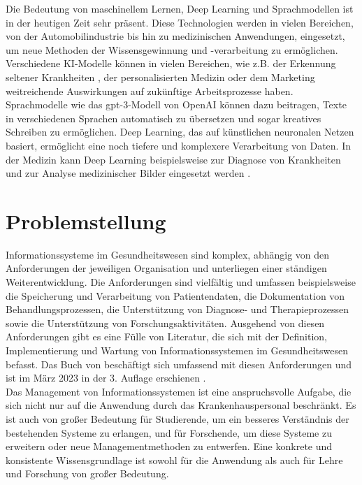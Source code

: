 Die Bedeutung von maschinellem Lernen, Deep Learning und Sprachmodellen ist in der heutigen Zeit sehr präsent.
Diese Technologien werden in vielen Bereichen, von der Automobilindustrie bis hin zu medizinischen Anwendungen, eingesetzt, um neue Methoden der Wissensgewinnung und -verarbeitung zu ermöglichen.
Verschiedene KI-Modelle können in vielen Bereichen, wie z.B. der Erkennung seltener Krankheiten \citep{rare_diseases}, der personalisierten Medizin \citep{precision_med} oder dem Marketing \citep{ai_marketing} weitreichende Auswirkungen auf zukünftige Arbeitsprozesse haben.
Sprachmodelle wie das \ac{gpt}-3-Modell von OpenAI \citep{gpt3} können dazu beitragen, Texte in verschiedenen Sprachen automatisch zu übersetzen und sogar kreatives Schreiben zu ermöglichen.
Deep Learning, das auf künstlichen neuronalen Netzen basiert, ermöglicht eine noch tiefere und komplexere Verarbeitung von Daten.
In der Medizin kann Deep Learning beispielsweise zur Diagnose von Krankheiten und zur Analyse medizinischer Bilder eingesetzt werden \citep{skincancer}.

\section{Problemstellung}\label{sec:problemstellung}
Informationssysteme im Gesundheitswesen sind komplex, abhängig von den Anforderungen der jeweiligen Organisation und unterliegen einer ständigen Weiterentwicklung.
Die Anforderungen sind vielfältig und umfassen beispielsweise die Speicherung und Verarbeitung von Patientendaten, die Dokumentation von Behandlungsprozessen, die Unterstützung von Diagnose- und Therapieprozessen sowie die Unterstützung von Forschungsaktivitäten.
Ausgehend von diesen Anforderungen gibt es eine Fülle von Literatur, die sich mit der Definition, Implementierung und Wartung von Informationssystemen im Gesundheitswesen befasst.
Das Buch  von \citeauthor{bb} beschäftigt sich umfassend mit diesen Anforderungen und ist im März 2023 in der 3. Auflage erschienen \citep{bb}.\\

Das Management von Informationssystemen ist eine anspruchsvolle Aufgabe, die sich nicht nur auf die Anwendung durch das Krankenhauspersonal beschränkt.
Es ist auch von großer Bedeutung für Studierende, um ein besseres Verständnis der bestehenden Systeme zu erlangen, und für Forschende, um diese Systeme zu erweitern oder neue Managementmethoden zu entwerfen.
Eine konkrete und konsistente Wissensgrundlage ist sowohl für die Anwendung als auch für Lehre und Forschung von großer Bedeutung.\\


